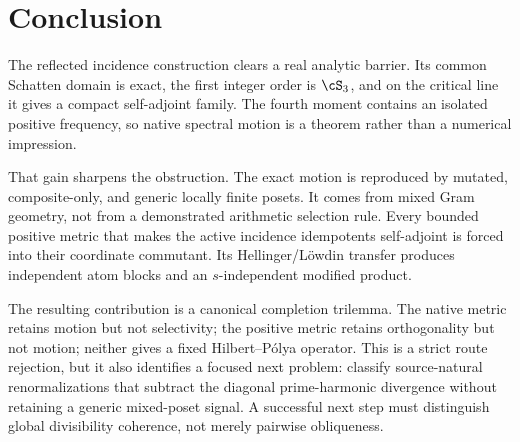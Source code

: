 \section{Conclusion}
\label{sec:conclusion}

The reflected incidence construction clears a real analytic barrier.
Its common Schatten domain is exact, the first integer order is
$\cS_3$, and on the critical line it gives a compact self-adjoint
family.  The fourth moment contains an isolated positive frequency,
so native spectral motion is a theorem rather than a numerical
impression.

That gain sharpens the obstruction.  The exact motion is reproduced by
mutated, composite-only, and generic locally finite posets.  It comes
from mixed Gram geometry, not from a demonstrated arithmetic
selection rule.  Every bounded positive metric that makes the active
incidence idempotents self-adjoint is forced into their coordinate
commutant.  Its Hellinger/L\"owdin transfer produces independent atom
blocks and an $s$-independent modified product.

The resulting contribution is a canonical completion trilemma.  The
native metric retains motion but not selectivity; the positive metric
retains orthogonality but not motion; neither gives a fixed
Hilbert--P\'olya operator.  This is a strict route rejection, but it
also identifies a focused next problem: classify source-natural
renormalizations that subtract the diagonal prime-harmonic divergence
without retaining a generic mixed-poset signal.  A successful next
step must distinguish global divisibility coherence, not merely
pairwise obliqueness.
